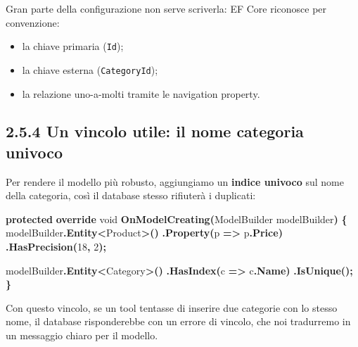 \documentclass[
  italian,
  10pt,
]{book}
\newenvironment{Shaded}{\begin{snugshade}}{\end{snugshade}}
\newcommand{\DataTypeTok}[1]{\textcolor[rgb]{0.13,0.29,0.53}{#1}}
\newcommand{\DecValTok}[1]{\textcolor[rgb]{0.00,0.00,0.81}{#1}}
\newcommand{\FunctionTok}[1]{\textcolor[rgb]{0.13,0.29,0.53}{\textbf{#1}}}
\newcommand{\KeywordTok}[1]{\textcolor[rgb]{0.13,0.29,0.53}{\textbf{#1}}}
\newcommand{\NormalTok}[1]{#1}
\newcommand{\OperatorTok}[1]{\textcolor[rgb]{0.81,0.36,0.00}{\textbf{#1}}}
\providecommand{\tightlist}{%
  \setlength{\itemsep}{0pt}\setlength{\parskip}{0pt}}
\begin{document}
Gran parte della configurazione non serve scriverla: EF Core riconosce
per convenzione:

\begin{itemize}
\tightlist
\item
  la chiave primaria (\texttt{Id});
\item
  la chiave esterna (\texttt{CategoryId});
\item
  la relazione uno-a-molti tramite le navigation property.
\end{itemize}

\subsection{2.5.4 Un vincolo utile: il nome categoria
univoco}\label{un-vincolo-utile-il-nome-categoria-univoco}

Per rendere il modello più robusto, aggiungiamo un \textbf{indice
univoco} sul nome della categoria, così il database stesso rifiuterà i
duplicati:

\begin{Shaded}
\begin{Highlighting}[]
\KeywordTok{protected} \KeywordTok{override} \DataTypeTok{void} \FunctionTok{OnModelCreating}\OperatorTok{(}\NormalTok{ModelBuilder modelBuilder}\OperatorTok{)}
\OperatorTok{\{}
\NormalTok{    modelBuilder}\OperatorTok{.}\FunctionTok{Entity}\OperatorTok{\textless{}}\NormalTok{Product}\OperatorTok{\textgreater{}()}
        \OperatorTok{.}\FunctionTok{Property}\OperatorTok{(}\NormalTok{p }\OperatorTok{=\textgreater{}}\NormalTok{ p}\OperatorTok{.}\FunctionTok{Price}\OperatorTok{)}
        \OperatorTok{.}\FunctionTok{HasPrecision}\OperatorTok{(}\DecValTok{18}\OperatorTok{,} \DecValTok{2}\OperatorTok{);}

\NormalTok{    modelBuilder}\OperatorTok{.}\FunctionTok{Entity}\OperatorTok{\textless{}}\NormalTok{Category}\OperatorTok{\textgreater{}()}
        \OperatorTok{.}\FunctionTok{HasIndex}\OperatorTok{(}\NormalTok{c }\OperatorTok{=\textgreater{}}\NormalTok{ c}\OperatorTok{.}\FunctionTok{Name}\OperatorTok{)}
        \OperatorTok{.}\FunctionTok{IsUnique}\OperatorTok{();}
\OperatorTok{\}}
\end{Highlighting}
\end{Shaded}

Con questo vincolo, se un tool tentasse di inserire due categorie con lo
stesso nome, il database risponderebbe con un errore di vincolo, che noi
tradurremo in un messaggio chiaro per il modello.
\end{document}
